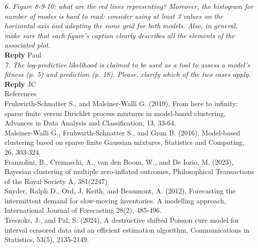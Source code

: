 \documentclass[12pt]{article}
\begin{document}
\textit{6. Figure 8-9-10: what are the red lines representing? Moreover, the histogram for number of modes is hard to read: consider using at least 3 values on the horizontal axis and adopting the same grid for both models. Also, in general, make sure that each figure's caption clearly describes all the elements of the associated plot.}\\

\textbf{Reply} Paul\\

\textit{7. The log-predictive likelihood is claimed to be used as a tool to assess a model's fitness (p. 5) and prediction (p. 18). Please, clarify which of the two cases apply.}\\

\textbf{Reply} JC\\

References\\

 Fruhwirth-Schnatter S., and Malsiner-Walli G. (2019), From here to infinity: sparse finite
versus Dirichlet process mixtures in model-based clustering, Advances in Data Analysis and
Classification, 13, 33-64.\\

 Malsiner-Walli G., Fruhwirth-Schnatter S., and Grun B. (2016), Model-based clustering based
on sparse finite Gaussian mixtures, Statistics and Computing, 26, 303-324.\\

 Franzolini, B., Cremaschi, A., van den Boom, W., and De Iorio, M. (2023), Bayesian clustering
of multiple zero-inflated outcomes, Philosophical Transactions of the Royal Society A,
381(2247)\\

 Snyder, Ralph D., Ord, J. Keith, and Beaumont, A. (2012), Forecasting the intermittent
demand for slow-moving inventories. A modelling approach, International Journal of Forecasting
28(2), 485-496.\\

Treszoks, J., and Pal, S. (2024), A destructive shifted Poisson cure model for interval censored
data and an efficient estimation algorithm, Communications in Statistics, 53(5), 2135-2149.

\noindent 




\end{document}
